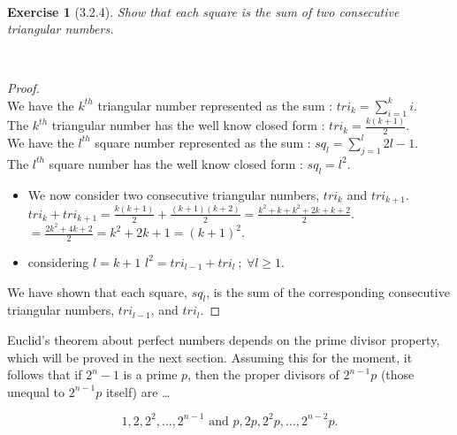 \documentclass[12pt]{article}
\newcommand{\XB}{\color{black}}
\newcommand{\XBB}{\color{blue}}
\newcommand{\ds}{\displaystyle}
\theoremstyle{plain}
\newtheorem{ex}{Exercise}
\begin{document}
\newpage
\XBB\hrulefill\XB \\
\begin{ex} [3.2.4]
  Show that each square is the sum of two consecutive triangular numbers.
\end{ex}
\XBB\hrulefill\XB \\

\begin{proof}
  \ \\

  We have the $k^{th}$ triangular number represented as the sum : $ \ds tri_{k} = \sum_{i = 1}^{k} i $. \\

  The $k^{th}$ triangular number has the well know closed form : $ \ds tri_{k} = \frac{k(k + 1)}{2} $. \\

  We have the $l^{th}$ square number represented as the sum : $ \ds sq_{l} = \sum_{j = 1}^{l} 2l -1 $. \\

  The $l^{th}$ square number has the well know closed form : $ \ds sq_{l} = l^{2} $. \\

  \begin{itemize}
    \item We now consider two consecutive triangular numbers, $ tri_{k} $ and $ tri_{k + 1} $.
    \subitem $ \ds tri_{k} + tri_{k + 1} = \frac{k(k + 1)}{2} + \frac{(k + 1)(k + 2)}{2} = \frac{k^{2} + k + k^{2} + 2k + k + 2}{2} $.
    \subitem $ \ds = \frac{2k^{2} + 4k + 2}{2} = k^{2} + 2k + 1 = (k + 1)^{2} $.
    \item considering $ l = k + 1 $
    \subitem $ l^{2} = tri_{l-1} + tri_{l} \ ; \ \forall l \ge 1 $.
  \end{itemize}

  We have shown that each square, $ sq_{l} $, is the sum of the corresponding consecutive triangular numbers, $ tri_{l-1} $, and $ tri_{l} $.

\end{proof}

\newpage

\begin{center}
  Euclid's theorem about perfect numbers depends on the prime divisor property, which will be proved in the next section. Assuming this for the moment, it follows that if $ 2^{n} - 1 $ is a prime $ p $, then the proper divisors of $ 2^{n - 1}p $ (those unequal to $ 2^{n - 1}p $ itself) are \dots
\end{center}
\[
  1,2,2^2,\ldots,2^{n - 1}\text{ and }p,2p,2^{2}p,\ldots,2^{n - 2}p.
\]
\end{document}
